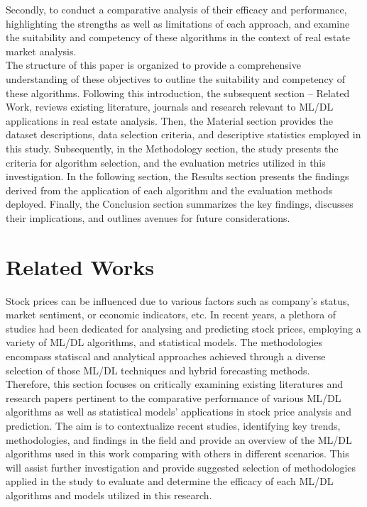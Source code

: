 \documentclass[conference]{IEEEtran}
\begin{document}
Secondly, to conduct a comparative analysis of their efficacy and performance, highlighting the strengths as well as limitations of each approach, and examine the suitability and competency of these algorithms in the context of real estate market analysis. \\
The structure of this paper is organized to provide a comprehensive understanding of these objectives to outline the suitability and competency of these algorithms. Following this introduction, the subsequent section – Related Work, reviews existing literature, journals and research relevant to ML/DL applications in real estate analysis. Then, the Material section provides the dataset descriptions, data selection criteria, and descriptive statistics employed in this study. Subsequently, in the Methodology section, the study presents the criteria for algorithm selection, and the evaluation metrics utilized in this investigation. In the following section, the Results section presents the findings derived from the application of each algorithm and the evaluation methods deployed. Finally, the Conclusion section summarizes the key findings, discusses their implications, and outlines avenues for future considerations.

\section{\textbf{Related Works}}

Stock prices can be influenced due to various factors such as company’s status, market sentiment, or economic indicators, etc. In recent years, a plethora of studies had been dedicated for analysing and predicting stock prices, employing a variety of ML/DL algorithms, and statistical models. The methodologies encompass statiscal and analytical approaches achieved through a diverse selection of those ML/DL techniques and hybrid forecasting methods.\\
Therefore, this section focuses on critically examining existing literatures and research papers pertinent to the comparative performance of various ML/DL algorithms as well as statistical models’ applications in stock price analysis and prediction. The aim is to contextualize recent studies, identifying key trends, methodologies, and findings in the field and provide an overview of the ML/DL algorithms used in this work comparing with others in different scenarios. This will assist further investigation and provide suggested selection of methodologies applied in the study to evaluate and determine the efficacy of each ML/DL algorithms and models utilized in this research.\\
\end{document}
